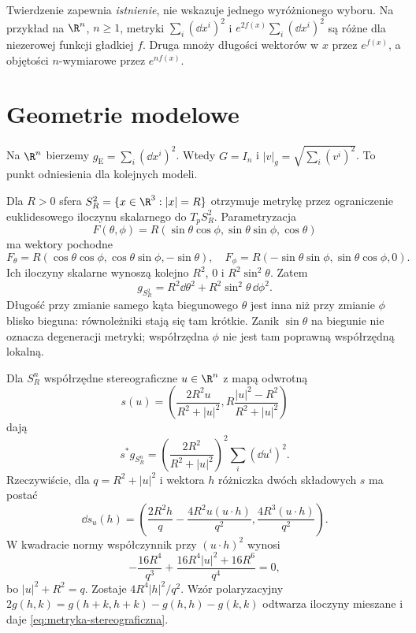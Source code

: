 Twierdzenie zapewnia \emph{istnienie}, nie wskazuje
jednego wyróżnionego wyboru. Na przykład na $\R^n$, $n\geq1$,
metryki $\sum_i(\dd x^i)^2$ i
$e^{2f(x)}\sum_i(\dd x^i)^2$ są różne dla
niezerowej funkcji gładkiej $f$. Druga mnoży
długości wektorów w $x$ przez $e^{f(x)}$,
a objętości $n$-wymiarowe przez $e^{nf(x)}$.


\section{Geometrie modelowe}
\label{sec:metryki-modelowe}

\begin{przyklad}
Na $\R^n$ bierzemy $g_{\mathrm E}=\sum_i(\dd x^i)^2$.
Wtedy $G=I_n$ i $|v|_g=\sqrt{\sum_i(v^i)^2}$.
To punkt odniesienia dla kolejnych modeli.
\end{przyklad}

\begin{przyklad}[Sfera]
\label{prz:metryka-sfery}
Dla $R>0$ sfera $S_R^2=\{x\in\R^3:|x|=R\}$ otrzymuje
metrykę przez ograniczenie euklidesowego iloczynu
skalarnego do $T_pS_R^2$. Parametryzacja
\[
 F(\theta,\phi)
 =R(\sin\theta\cos\phi,\sin\theta\sin\phi,\cos\theta)
\]
ma wektory pochodne
\[
 F_\theta
 =R(\cos\theta\cos\phi,\cos\theta\sin\phi,-\sin\theta),
 \quad
 F_\phi
 =R(-\sin\theta\sin\phi,\sin\theta\cos\phi,0).
\]
Ich iloczyny skalarne wynoszą kolejno
$R^2$, $0$ i $R^2\sin^2\theta$. Zatem
\begin{equation}\label{eq:metryka-sfery}
 g_{S_R^2}=R^2\dd\theta^2
       +R^2\sin^2\theta\,\dd\phi^2.
\end{equation}
Długość przy zmianie samego kąta biegunowego
$\theta$ jest inna niż przy zmianie $\phi$ blisko
bieguna: równoleżniki stają się tam krótkie.
Zanik $\sin\theta$ na biegunie nie oznacza
degeneracji metryki; współrzędna $\phi$ nie jest
tam poprawną współrzędną lokalną.

Dla $S_R^n$ współrzędne stereograficzne $u\in\R^n$
z mapą odwrotną
\[
 s(u)=\left(\frac{2R^2u}{R^2+|u|^2},
            R\frac{|u|^2-R^2}{R^2+|u|^2}\right)
\]
dają
\begin{equation}\label{eq:metryka-stereograficzna}
 s^*g_{S_R^n}
 =\left(\frac{2R^2}{R^2+|u|^2}\right)^2
   \sum_i(\dd u^i)^2.
\end{equation}
Rzeczywiście, dla $q=R^2+|u|^2$ i wektora $h$
różniczka dwóch składowych $s$ ma postać
\[
 \dd s_u(h)=
 \left(\frac{2R^2h}{q}
       -\frac{4R^2u(u\cdot h)}{q^2},
       \frac{4R^3(u\cdot h)}{q^2}\right).
\]
W kwadracie normy współczynnik przy $(u\cdot h)^2$ wynosi
\[
 -\frac{16R^4}{q^3}
 +\frac{16R^4|u|^2+16R^6}{q^4}=0,
\]
bo $|u|^2+R^2=q$. Zostaje $4R^4|h|^2/q^2$.
Wzór polaryzacyjny
$2g(h,k)=g(h+k,h+k)-g(h,h)-g(k,k)$
odtwarza iloczyny mieszane i daje
\eqref{eq:metryka-stereograficzna}.
\end{przyklad}

